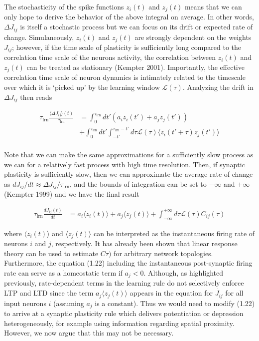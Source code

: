 \documentclass{ucetd}
\begin{document}
The stochasticity of the spike functions $z_{i}(t)$ and $z_{j}(t)$ means that we can only hope to derive the behavior of the above integral on average. In other words, $\Delta J_{ij}$ is itself a stochastic process but we can focus on its drift or expected rate of change. Simulaneously, $z_{i}(t)$ and $z_{j}(t)$ are strongly dependent on the weights $J_{ij}$; however, if the time scale of plasticity is sufficiently long compared to the correlation time scale of the neurons activity, the correlation between $z_{i}(t)$ and $z_{j}(t)$ can be treated as stationary (Kempter 2001). Importantly, the effective correlation time scale of neuron dynamics is intimately related to the timescale over which it is `picked up' by the learning window $\mathcal{L}(\tau)$. Analyzing the drift in $\Delta J_{ij}$ then reads


\begin{align*}
\tau_{\mathrm{lrn}}\frac{\langle \Delta J_{ij}\rangle(t)}{\tau_{\mathrm{lrn}}} &= \int_{0}^{\tau_{\mathrm{lrn}}} dt'\left(a_{i}z_{i}(t') + a_{j}z_{j}(t')\right)\\
&+ \int_{0}^{\tau_{\mathrm{lrn}}} dt'\int_{-t'}^{\tau_{\mathrm{lrn}}-t'} d\tau \mathcal{L}(\tau)\langle z_{i}(t'+\tau)z_{j}(t')\rangle\\
\end{align*}

Note that we can make the same approximations for a sufficiently slow process as we can for a relatively fast process with high time resolution. Then, if synaptic plasticity is sufficiently slow, then we can approximate the average rate of change as $dJ_{ij}/dt \approx \Delta J_{ij}/\tau_{\mathrm{lrn}}$, and the bounds of integration can be set to $-\infty$ and $+\infty$ (Kempter 1999) and we have the final result


\begin{align}
\tau_{\mathrm{lrn}}\frac{d J_{ij}(t)}{dt} &=  a_{i}\langle z_{i}(t)\rangle  + a_{j}\langle z_{j}(t)\rangle + \int_{-\infty}^{+\infty} d\tau \mathcal{L}(\tau)C_{ij}(\tau)
\end{align}

where $\langle z_{i}(t)\rangle$ and $\langle z_{j}(t)\rangle$ can be interpreted as the instantaneous firing rate of neurons $i$ and $j$, respectively. It has already been shown that linear response theory can be used to estimate $C\tau)$ for arbitrary network topologies. Furthermore, the equation (1.22) including the instantaneous post-synaptic firing rate can serve as a homeostatic term if $a_{j} < 0$. Although, as highlighted previously, rate-dependent terms in the learning rule do not selectively enforce LTP and LTD since the term $a_{j}\langle z_{j}(t)\rangle$ appears in the equation for $\dot{J_{ij}}$ for all input neurons $i$ (assuming $a_{j}$ is a constant). Thus we would need to modify (1.22) to arrive at a synaptic plasticity rule which delivers potentiation or depression heterogeneously, for example using information regarding spatial proximity. However, we now argue that this may not be necessary.
\end{document}
